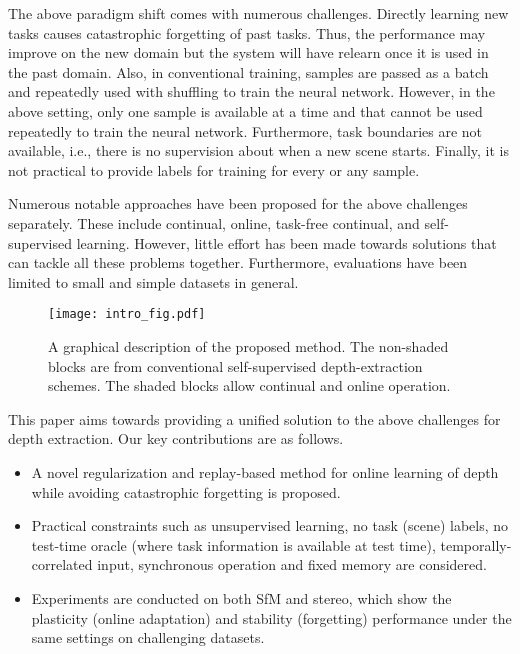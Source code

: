 \documentclass[lettersize,journal]{IEEEtran}
\begin{document}
 The above paradigm shift comes with numerous challenges. Directly learning new tasks causes catastrophic forgetting of past tasks. Thus, the performance may improve on the new domain but the system will have relearn once it is used in the past domain. Also, in conventional training, samples are passed as a batch and repeatedly used with shuffling to train the neural network. However, in the above setting, only one sample is available at a time and that cannot be used repeatedly to train the neural network. Furthermore, task boundaries are not available, i.e., there is no supervision about when a new scene starts. Finally, it is not practical to provide labels for training for every or any sample.
 
 Numerous notable approaches have been proposed for the above challenges separately. These include continual, online, task-free continual, and self-supervised learning. However, little effort has been made towards solutions that can tackle all these problems together. Furthermore, evaluations have been limited to small and simple datasets in general. 
 
 \begin{figure*}[!hbt]
    \small
    \begin{center}
       \texttt{[image: intro\_fig.pdf]}
       \caption{A graphical description of the proposed method. The non-shaded blocks are from conventional self-supervised depth-extraction schemes. The shaded blocks allow continual and online operation.}
       \label{fig:intro_fig}
    \end{center}
 \end{figure*}
 
 
 This paper aims towards providing a unified solution to the above challenges for depth extraction. Our key contributions are as follows.
 \begin{itemize}
    \item A novel regularization and replay-based method for online learning of depth while avoiding catastrophic forgetting is proposed.
    \item Practical constraints such as unsupervised learning, no task (scene) labels, no test-time oracle (where task information is available at test time), temporally-correlated input, synchronous operation and fixed memory are considered.
    \item Experiments are conducted on both SfM and stereo, which show the plasticity (online adaptation) and stability (forgetting) performance under the same settings on challenging datasets.
 \end{itemize} 
 
\end{document}
